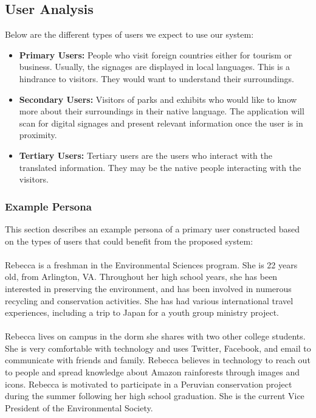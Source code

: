 \documentclass[12pt]{article}
\begin{document}
\subsection{User Analysis}

Below are the different types of users we expect to use our system:

\begin{itemize}

 \item \textbf{Primary Users:} People who visit foreign countries either for tourism or business. Usually, the signages are displayed in local languages. This is a hindrance to visitors. They would want to understand their surroundings.
 
  \item \textbf{Secondary Users:} Visitors of parks and exhibits who would like to know more about their surroundings in their native language. The application will scan for digital signages and present relevant information once the user is in proximity.
  
  \item \textbf{Tertiary Users: } Tertiary users are the users who interact with the translated information. They may be the native people interacting with the visitors. 
  
\end{itemize}

\subsubsection{Example Persona}
\label{persona}

This section describes an example persona of a primary user constructed based on the types of users that could benefit from the proposed system:

\paragraph{}Rebecca is a freshman in the Environmental Sciences program. She is 22 years old,
from Arlington, VA. Throughout her high school years, she has been interested in preserving the environment, and has been involved in numerous recycling and conservation activities. She has had various international travel experiences, including a trip to Japan for a youth group ministry project.

\paragraph{} Rebecca lives on campus in the dorm she shares with two other college students. She is very comfortable with technology and uses Twitter, Facebook, and email to communicate with friends and family. Rebecca believes in technology to reach out to people and spread knowledge about
Amazon rainforests through images and icons. Rebecca is motivated to participate in a Peruvian conservation project during the summer following her high school graduation. She is the current Vice President of the Environmental Society.
\end{document}
